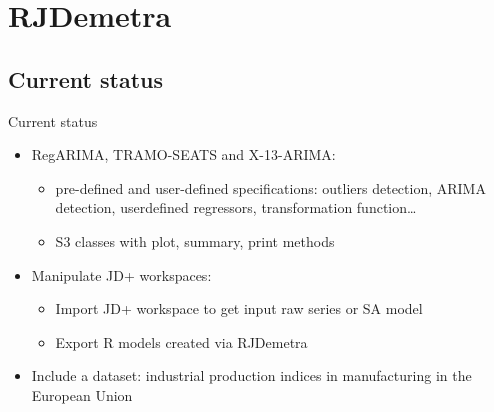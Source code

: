 \documentclass[10pt,xcolor=table,color={dvipsnames,usenames},ignorenonframetext,usepdftitle=false,french]{beamer}
\providecommand{\tightlist}{%
  \setlength{\parskip}{0pt}
  }
\begin{document}
\hypertarget{rjdemetra}{%
\section{RJDemetra}\label{rjdemetra}}

\hypertarget{current-status}{%
\subsection{Current status}\label{current-status}}

\begin{frame}{Current status}
\protect\hypertarget{current-status-1}{}

\begin{itemize}
\tightlist
\item
  RegARIMA, TRAMO-SEATS and X-13-ARIMA:

  \begin{itemize}
  \tightlist
  \item
    pre-defined and user-defined specifications: outliers detection,
    ARIMA detection, userdefined regressors, transformation
    function\ldots{}\\
  \item
    S3 classes with plot, summary, print methods
  \end{itemize}
\end{itemize}

\medskip

\begin{itemize}
\tightlist
\item
  Manipulate JD+ workspaces:

  \begin{itemize}
  \tightlist
  \item
    Import JD+ workspace to get input raw series or SA model
  \item
    Export R models created via RJDemetra
  \end{itemize}
\end{itemize}

\medskip

\begin{itemize}
\tightlist
\item
  Include a dataset: industrial production indices in manufacturing in
  the European Union
\end{itemize}

\end{frame}
\end{document}
